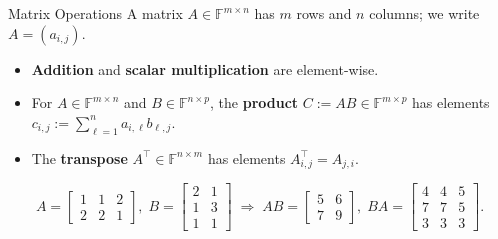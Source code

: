 \documentclass{zkdl-presentation-template}
\begin{document}
    \begin{frame}{Matrix Operations}
        A matrix $A \in \mathbb{F}^{m \times n}$ has $m$ rows and $n$ columns; we write $A = (a_{i,j})$.
        \begin{definition}
            \begin{itemize}
                \item \textbf{Addition} and \textbf{scalar multiplication} are element-wise.
                \item For $A \in \mathbb{F}^{m \times n}$ and $B \in \mathbb{F}^{n \times p}$, the \textbf{product} $C := AB \in \mathbb{F}^{m \times p}$ has elements $c_{i,j} := \sum_{\ell=1}^{n} a_{i,\ell}b_{\ell,j}$.
                \item The \textbf{transpose} $A^{\top} \in \mathbb{F}^{n \times m}$ has elements $A^{\top}_{i,j} = A_{j,i}$.
            \end{itemize}
        \end{definition}
        \pause

        \begin{example}
            \begin{equation*}
                A = \begin{bmatrix}
                    1 & 1 & 2 \\
                    2 & 2 & 1
                \end{bmatrix}, \; B = \begin{bmatrix}
                    2 & 1 \\
                    1 & 3 \\
                    1 & 1
                \end{bmatrix} \; \Longrightarrow \; AB = \begin{bmatrix}
                    5 & 6 \\ 7 & 9
                \end{bmatrix}, \; BA = \begin{bmatrix}
                    4 & 4 & 5 \\
                    7 & 7 & 5 \\
                    3 & 3 & 3
                \end{bmatrix}.
            \end{equation*}
        \end{example}
    \end{frame}
\end{document}
